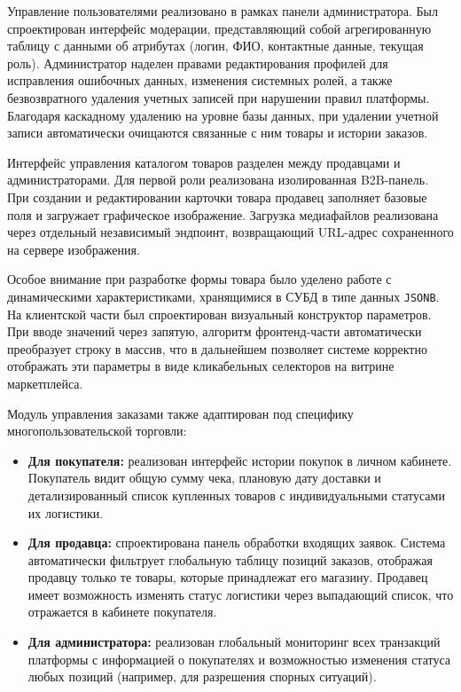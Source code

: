 Управление пользователями реализовано в рамках панели администратора. Был спроектирован интерфейс модерации, представляющий собой 
агрегированную таблицу с данными об атрибутах (логин, ФИО, контактные данные, текущая роль). Администратор наделен правами редактирования 
профилей для исправления ошибочных данных, изменения системных ролей, а также безвозвратного удаления учетных записей при нарушении правил 
платформы. Благодаря каскадному удалению на уровне базы данных, при удалении учетной записи автоматически очищаются связанные с ним товары и истории заказов.

Интерфейс управления каталогом товаров разделен между продавцами и администраторами. Для первой роли реализована изолированная B2B-панель. При создании и 
редактировании карточки товара продавец заполняет базовые поля и загружает графическое изображение. Загрузка медиафайлов реализована через 
отдельный независимый эндпоинт, возвращающий URL-адрес сохраненного на сервере изображения. 

Особое внимание при разработке формы товара было уделено работе с динамическими характеристиками, хранящимися в СУБД в типе данных \texttt{JSONB}. На клиентской 
части был спроектирован визуальный конструктор параметров. При вводе значений через запятую, алгоритм фронтенд-части автоматически преобразует 
строку в массив, что в дальнейшем позволяет системе корректно отображать эти параметры в виде кликабельных селекторов на витрине маркетплейса. 

Модуль управления заказами также адаптирован под специфику многопользовательской торговли:
\begin{itemize}
    \item \textbf{Для покупателя:} реализован интерфейс истории покупок в личном кабинете. Покупатель видит общую сумму чека, плановую дату доставки и 
	детализированный список купленных товаров с индивидуальными статусами их логистики.
    \item \textbf{Для продавца:} спроектирована панель обработки входящих заявок. Система автоматически фильтрует 
	глобальную таблицу позиций заказов, отображая продавцу только те товары, которые принадлежат его магазину. Продавец имеет возможность изменять 
	статус логистики через выпадающий список, что отражается в кабинете покупателя.
    \item \textbf{Для администратора:} реализован глобальный мониторинг всех транзакций платформы с информацией о покупателях  и 
	возможностью изменения статуса любых позиций (например, для разрешения спорных ситуаций).
\end{itemize}


